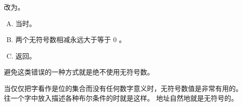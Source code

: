 {{        %
        \begin{practices}
            改为。
        \end{practices}

        \begin{practicec}
            \begin{enumerate}[A.]
                \item 当时。
                \item 两个无符号数相减永远大于等于 $0$ 。
                \item 返回。
            \end{enumerate}
        \end{practicec}

        避免这类错误的一种方式就是绝不使用无符号数。

        当仅仅把字看作是位的集合而没有任何数字意义时，无符号数值是非常有用的。
        往一个字中放入描述各种布尔条件的时就是这样。
        地址自然地就是无符号的。
    }
}

